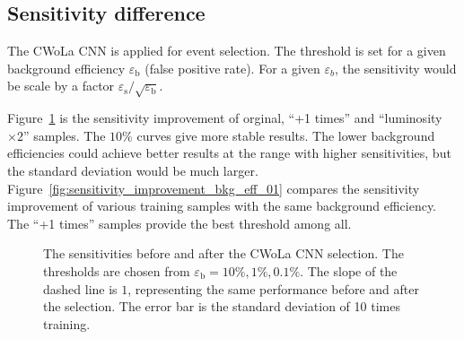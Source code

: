 \documentclass[12pt]{article}
\begin{document}
	\subsection{Sensitivity difference}%
	\label{sub:sensitivity_difference}
		The CWoLa CNN is applied for event selection. The threshold is set for a given background efficiency $\varepsilon_{\text{b}}$ (false positive rate). For a given $\varepsilon_b$, the sensitivity would be scale by a factor ${\varepsilon_\text{s}} / {\sqrt{\varepsilon_{\text{b}}}}$.

		Figure~\ref{fig:sensitivity_improvement_origin_aug_1_x2} is the sensitivity improvement of orginal, ``+1 times'' and ``luminosity $\times 2$'' samples. The $10\%$ curves give more stable results. The lower background efficiencies could achieve better results at the range with higher sensitivities, but the standard deviation would be much larger. Figure~\ref{fig:sensitivity_improvement_bkg_eff_01} compares the sensitivity improvement of various training samples with the same background efficiency. The ``+1 times'' samples provide the best threshold among all.

		\begin{figure}[htpb]
			\centering
			\caption{The sensitivities before and after the CWoLa CNN selection. The thresholds are chosen from $\varepsilon_{\text{b}} = 10\%, 1\%, 0.1\%$. The slope of the dashed line is $1$, representing the same performance before and after the selection. The error bar is the standard deviation of 10 times training.}
			\label{fig:sensitivity_improvement_origin_aug_1_x2}
		\end{figure}
\end{document}
